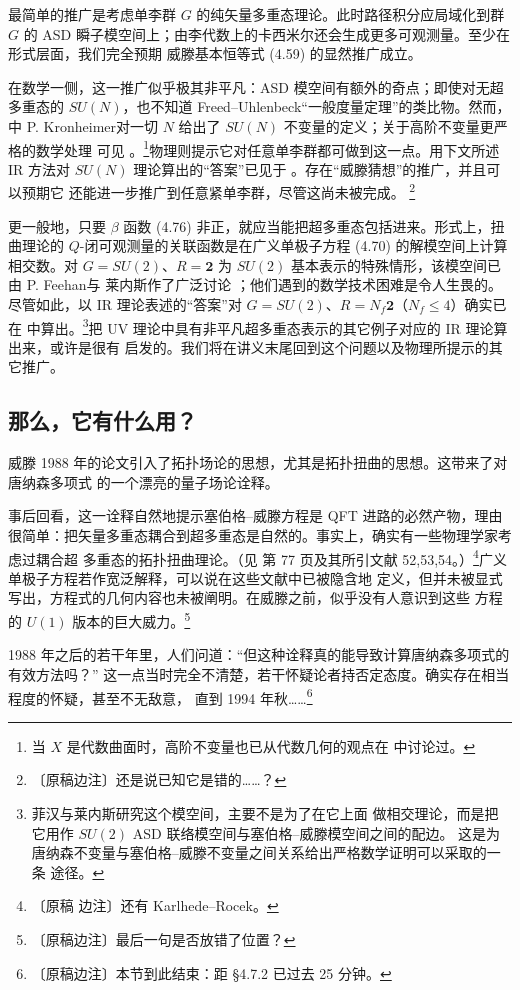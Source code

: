 最简单的推广是考虑单李群 $G$ 的纯矢量多重态理论。此时路径积分应局域化到群 $G$ 的 ASD
瞬子模空间上；由李代数上的卡西米尔还会生成更多可观测量。至少在形式层面，我们完全预期
威滕基本恒等式 (4.59) 的显然推广成立。

在数学一侧，这一推广似乎极其非平凡：ASD 模空间有额外的奇点；即使对无超多重态的
$SU(N)$，也不知道 Freed--Uhlenbeck“一般度量定理”的类比物。然而，\cite{ref22} 中
P. Kronheimer对一切 $N$ 给出了 $SU(N)$ 不变量的定义；关于高阶不变量更严格的数学处理
可见 \cite{ref5}。\footnote{当 $X$ 是代数曲面时，高阶不变量也已从代数几何的观点在
\cite{ref36} 中讨论过。}物理则提示它对任意单李群都可做到这一点。用下文所述 IR 方法对
$SU(N)$ 理论算出的“答案”已见于 \cite{ref31}。存在“威滕猜想”的推广，并且可以预期它
还能进一步推广到任意紧单李群，尽管这尚未被完成。
\footnote{〔原稿边注〕还是说已知它是错的……？}

更一般地，只要 $\beta$ 函数 (4.76) 非正，就应当能把超多重态包括进来。形式上，扭曲理论的
$Q$-闭可观测量的关联函数是在广义单极子方程 (4.70) 的解模空间上计算相交数。对
$G=SU(2)$、$R=\mathbf{2}$ 为 $SU(2)$ 基本表示的特殊情形，该模空间已由 P. Feehan与
莱内斯作了广泛讨论 \cite{ref14}；他们遇到的数学技术困难是令人生畏的。尽管如此，以 IR
理论表述的“答案”对 $G=SU(2)$、$R=N_{f}\mathbf{2}$（$N_{f}\le4$）确实已在
\cite{ref38} 中算出。\footnote{菲汉与莱内斯研究这个模空间，主要不是为了在它上面
做相交理论，而是把它用作 $SU(2)$ ASD 联络模空间与塞伯格--威滕模空间之间的配边。
这是为唐纳森不变量与塞伯格--威滕不变量之间关系给出严格数学证明可以采取的一条
途径。}把 UV 理论中具有非平凡超多重态表示的其它例子对应的 IR 理论算出来，或许是很有
启发的。我们将在讲义末尾回到这个问题以及物理所提示的其它推广。

\subsection{那么，它有什么用？}
\label{sec:4-8}

威滕 1988 年的论文引入了拓扑场论的思想，尤其是拓扑扭曲的思想。这带来了对唐纳森多项式
的一个漂亮的量子场论诠释。

事后回看，这一诠释自然地提示塞伯格--威滕方程是 QFT 进路的必然产物，理由
很简单：把矢量多重态耦合到超多重态是自然的。事实上，确实有一些物理学家考虑过耦合超
多重态的拓扑扭曲理论。（见 \cite{ref24} 第 77 页及其所引文献 52,53,54。）\footnote{〔原稿
边注〕还有 Karlhede--Rocek。}广义单极子方程若作宽泛解释，可以说在这些文献中已被隐含地
定义，但并未被显式写出，方程式的几何内容也未被阐明。在威滕之前，似乎没有人意识到这些
方程的 $U(1)$ 版本的巨大威力。\footnote{〔原稿边注〕最后一句是否放错了位置？}

1988 年之后的若干年里，人们问道：“但这种诠释真的能导致计算唐纳森多项式的有效方法吗？”
这一点当时完全不清楚，若干怀疑论者持否定态度。确实存在相当程度的怀疑，甚至不无敌意，
直到 1994 年秋……\footnote{〔原稿边注〕本节到此结束：距 §4.7.2 已过去 25 分钟。}

